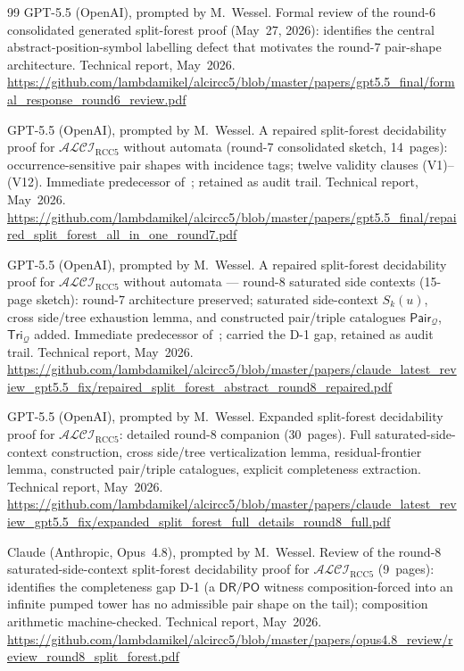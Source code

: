 \documentclass[11pt]{article}
\newcommand{\ALCIRCC}[1]{\mathcal{ALCI}_{\mathrm{RCC#1}}}
\newcommand{\DR}{\mathsf{DR}}
\newcommand{\PO}{\mathsf{PO}}
\newcommand{\Q}{\ensuremath{\mathcal Q}}
\newcommand{\Pair}{\ensuremath{\mathsf{Pair}}}
\newcommand{\Tri}{\ensuremath{\mathsf{Tri}}}
\theoremstyle{plain}
\theoremstyle{definition}
\begin{document}
\begin{thebibliography}{99}
GPT-5.5 (OpenAI), prompted by M.\ Wessel.
\newblock Formal review of the round-6 consolidated generated
  split-forest proof (May~27, 2026): identifies the central
  abstract-position-symbol labelling defect that motivates the
  round-7 pair-shape architecture.
\newblock Technical report, May~2026.
\newblock \url{https://github.com/lambdamikel/alcircc5/blob/master/papers/gpt5.5_final/formal_response_round6_review.pdf}

GPT-5.5 (OpenAI), prompted by M.\ Wessel.
\newblock A repaired split-forest decidability proof for
  $\ALCIRCC{5}$ without automata (round-7 consolidated sketch,
  14~pages): occurrence-sensitive pair shapes with incidence
  tags; twelve validity clauses (V1)--(V12).  Immediate
  predecessor of~\cite{GPT55Round8Sketch}; retained as audit trail.
\newblock Technical report, May~2026.
\newblock \url{https://github.com/lambdamikel/alcircc5/blob/master/papers/gpt5.5_final/repaired_split_forest_all_in_one_round7.pdf}

GPT-5.5 (OpenAI), prompted by M.\ Wessel.
\newblock A repaired split-forest decidability proof for
  $\ALCIRCC{5}$ without automata --- round-8 saturated side
  contexts (15-page sketch): round-7 architecture preserved;
  saturated side-context $S_k(u)$, cross side/tree exhaustion
  lemma, and constructed pair/triple catalogues
  $\Pair_\Q$, $\Tri_\Q$ added.  Immediate predecessor
  of~\cite{GPT55Round9Sketch}; carried the D-1 gap, retained as
  audit trail.
\newblock Technical report, May~2026.
\newblock \url{https://github.com/lambdamikel/alcircc5/blob/master/papers/claude_latest_review_gpt5.5_fix/repaired_split_forest_abstract_round8_repaired.pdf}

GPT-5.5 (OpenAI), prompted by M.\ Wessel.
\newblock Expanded split-forest decidability proof for
  $\ALCIRCC{5}$: detailed round-8 companion (30~pages).  Full
  saturated-side-context construction, cross side/tree
  verticalization lemma, residual-frontier lemma, constructed
  pair/triple catalogues, explicit completeness extraction.
\newblock Technical report, May~2026.
\newblock \url{https://github.com/lambdamikel/alcircc5/blob/master/papers/claude_latest_review_gpt5.5_fix/expanded_split_forest_full_details_round8_full.pdf}

Claude (Anthropic, Opus~4.8), prompted by M.\ Wessel.
\newblock Review of the round-8 saturated-side-context split-forest
  decidability proof for $\ALCIRCC{5}$ (9~pages): identifies the
  completeness gap D-1 (a $\DR/\PO$ witness composition-forced into
  an infinite pumped tower has no admissible pair shape on the
  tail); composition arithmetic machine-checked.
\newblock Technical report, May~2026.
\newblock \url{https://github.com/lambdamikel/alcircc5/blob/master/papers/opus4.8_review/review_round8_split_forest.pdf}


\end{thebibliography}
\end{document}
